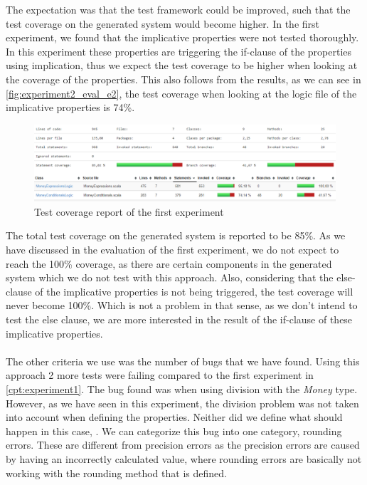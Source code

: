 The expectation was that the test framework could be improved, such that the test
coverage on the generated system would become higher. In the first experiment,
we found that the implicative properties were not tested thoroughly. In
this experiment these properties are triggering the if-clause of the properties
using implication, thus we expect the test coverage to be higher when looking at
the coverage of the properties. This also follows from the results, as we can
see in \autoref{fig:experiment2_eval_e2}, the test coverage when looking at the
logic file of the implicative properties is 74\%.
\FloatBarrier
\begin{figure}[!ht]
	\includegraphics[width=\linewidth]{figures/eval_experiment2}
\caption{Test coverage report of the first experiment}
\label{fig:experiment2_eval_e2}
\centering
\end{figure}
\FloatBarrier
The total test coverage on the generated system is reported to be 85\%. As we
have discussed in the evaluation of the first experiment, we do not expect to
reach the 100\% coverage, as there are certain components in the generated
system which we do not test with this approach. Also, considering that the
else-clause of the implicative properties is not being triggered, the test
coverage will never become 100\%. Which is not a problem in that sense, as we
don't intend to test the else clause, we are more interested in the result of
the if-clause of these implicative properties.\\
\\
The other criteria we use was the number of bugs that we have found. Using this
approach 2 more tests were failing compared to the first experiment in
\autoref{cpt:experiment1}. The bug found was when using division with the
\textit{Money} type. However, as we have seen in this experiment, the division
problem was not taken into account when defining the properties. Neither did we define what should happen in this case, . We can categorize this bug into one
category, rounding errors. These are different from precision errors as the
precision errors are caused by having an incorrectly calculated value, where
rounding errors are basically not working with the rounding method that is
defined.

